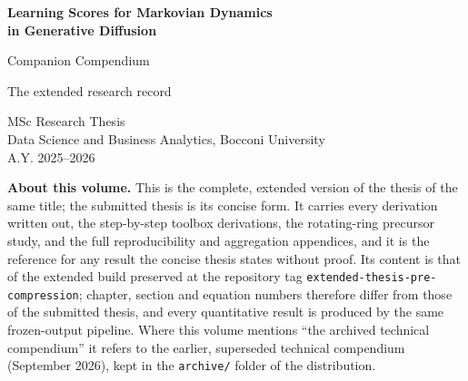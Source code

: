 \documentclass[12pt,a4paper,openany]{report}
\begin{document}
\begin{titlepage}
\thispagestyle{empty}
\centering
\vspace*{2.5cm}
{\LARGE\bfseries Learning Scores for Markovian Dynamics\\[0.3em]
in Generative Diffusion\par}
\vspace{1.4cm}
{\Large Companion Compendium\par}
\vspace{0.4em}
{\large The extended research record\par}
\vspace{2.2cm}
{\normalsize MSc Research Thesis\\
Data Science and Business Analytics, Bocconi University\\
A.Y. 2025--2026\par}
\vfill
\begin{minipage}{0.88\linewidth}\small
\noindent\textbf{About this volume.} This is the complete, extended version
of the thesis of the same title; the submitted thesis is its concise form.
It carries every derivation written out, the step-by-step toolbox
derivations, the rotating-ring precursor study, and the full reproducibility
and aggregation appendices, and it is the reference for any result the
concise thesis states without proof. Its content is that of the extended
build preserved at the repository tag \texttt{extended-thesis-pre-compression};
chapter, section and equation numbers therefore differ from those of the
submitted thesis, and every quantitative result is produced by the same
frozen-output pipeline. Where this volume mentions ``the archived technical
compendium'' it refers to the earlier, superseded technical compendium
(September 2026), kept in the \texttt{archive/} folder of the distribution.
\end{minipage}
\vspace{1cm}
\end{titlepage}

\setcounter{page}{2}
\tableofcontents
\clearpage
\ifodd\value{page}\else\null\thispagestyle{empty}\clearpage\fi


\end{document}
